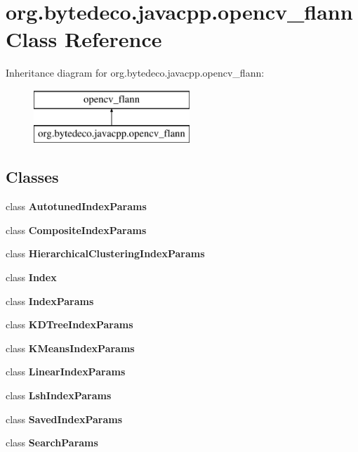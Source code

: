 \hypertarget{classorg_1_1bytedeco_1_1javacpp_1_1opencv__flann}{}\section{org.\+bytedeco.\+javacpp.\+opencv\+\_\+flann Class Reference}
\label{classorg_1_1bytedeco_1_1javacpp_1_1opencv__flann}
Inheritance diagram for org.\+bytedeco.\+javacpp.\+opencv\+\_\+flann\+:\begin{figure}[H]
\begin{center}
\leavevmode
\includegraphics[height=2.000000cm]{classorg_1_1bytedeco_1_1javacpp_1_1opencv__flann}
\end{center}
\end{figure}
\subsection*{Classes}
\begin{DoxyCompactItemize}
\item 
class {\bfseries Autotuned\+Index\+Params}
\item 
class {\bfseries Composite\+Index\+Params}
\item 
class {\bfseries Hierarchical\+Clustering\+Index\+Params}
\item 
class {\bfseries Index}
\item 
class {\bfseries Index\+Params}
\item 
class {\bfseries K\+D\+Tree\+Index\+Params}
\item 
class {\bfseries K\+Means\+Index\+Params}
\item 
class {\bfseries Linear\+Index\+Params}
\item 
class {\bfseries Lsh\+Index\+Params}
\item 
class {\bfseries Saved\+Index\+Params}
\item 
class {\bfseries Search\+Params}
\end{DoxyCompactItemize}
